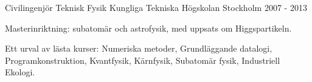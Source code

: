 


\begin{cventries}




\cventry
{Civilingenj{\"o}r Teknisk Fysik} %
{Kungliga Tekniska H{\"o}gskolan} %
{Stockholm} %
{2007 - 2013} %
{ %
\begin{cvitems}
\item {Masterinriktning: subatom{\"a}r och astrofysik, med uppsats om Higgspartikeln.}
\item {Ett urval av l{\"a}sta kurser: Numeriska metoder, Grundl{\"a}ggande datalogi, Programkonstruktion, Kvantfysik, K{\"a}rnfysik, Subatom{\"a}r fysik, Industriell Ekologi.}
\end{cvitems}
}


\end{cventries}
